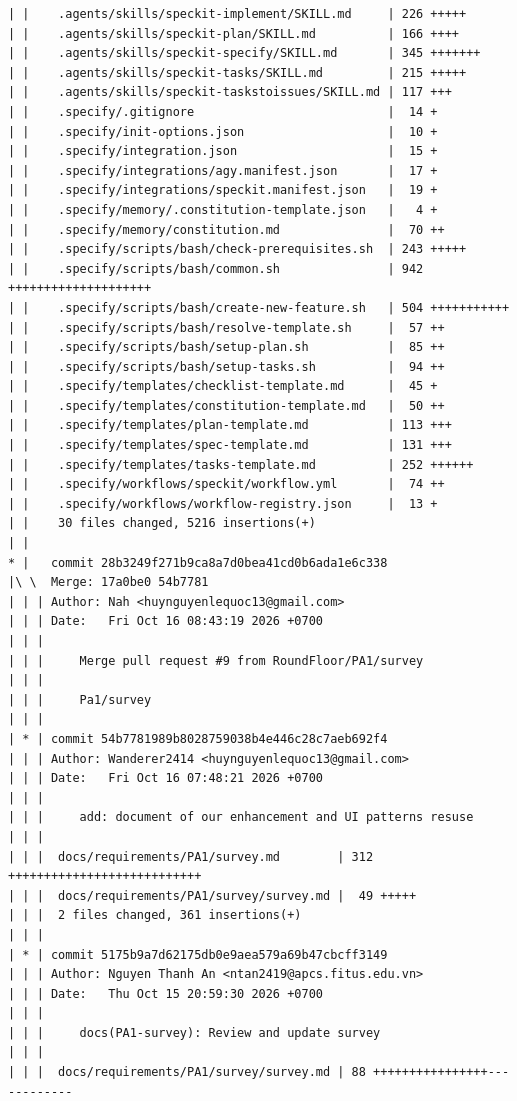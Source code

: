 \documentclass[12pt]{article}
\begin{document}
\begin{lstlisting}[numbers=none,breaklines=true]
| |    .agents/skills/speckit-implement/SKILL.md     | 226 +++++
| |    .agents/skills/speckit-plan/SKILL.md          | 166 ++++
| |    .agents/skills/speckit-specify/SKILL.md       | 345 +++++++
| |    .agents/skills/speckit-tasks/SKILL.md         | 215 +++++
| |    .agents/skills/speckit-taskstoissues/SKILL.md | 117 +++
| |    .specify/.gitignore                           |  14 +
| |    .specify/init-options.json                    |  10 +
| |    .specify/integration.json                     |  15 +
| |    .specify/integrations/agy.manifest.json       |  17 +
| |    .specify/integrations/speckit.manifest.json   |  19 +
| |    .specify/memory/.constitution-template.json   |   4 +
| |    .specify/memory/constitution.md               |  70 ++
| |    .specify/scripts/bash/check-prerequisites.sh  | 243 +++++
| |    .specify/scripts/bash/common.sh               | 942 ++++++++++++++++++++
| |    .specify/scripts/bash/create-new-feature.sh   | 504 +++++++++++
| |    .specify/scripts/bash/resolve-template.sh     |  57 ++
| |    .specify/scripts/bash/setup-plan.sh           |  85 ++
| |    .specify/scripts/bash/setup-tasks.sh          |  94 ++
| |    .specify/templates/checklist-template.md      |  45 +
| |    .specify/templates/constitution-template.md   |  50 ++
| |    .specify/templates/plan-template.md           | 113 +++
| |    .specify/templates/spec-template.md           | 131 +++
| |    .specify/templates/tasks-template.md          | 252 ++++++
| |    .specify/workflows/speckit/workflow.yml       |  74 ++
| |    .specify/workflows/workflow-registry.json     |  13 +
| |    30 files changed, 5216 insertions(+)
| |
* |   commit 28b3249f271b9ca8a7d0bea41cd0b6ada1e6c338
|\ \  Merge: 17a0be0 54b7781
| | | Author: Nah <huynguyenlequoc13@gmail.com>
| | | Date:   Fri Oct 16 08:43:19 2026 +0700
| | |
| | |     Merge pull request #9 from RoundFloor/PA1/survey
| | |
| | |     Pa1/survey
| | |
| * | commit 54b7781989b8028759038b4e446c28c7aeb692f4
| | | Author: Wanderer2414 <huynguyenlequoc13@gmail.com>
| | | Date:   Fri Oct 16 07:48:21 2026 +0700
| | |
| | |     add: document of our enhancement and UI patterns resuse
| | |
| | |  docs/requirements/PA1/survey.md        | 312 +++++++++++++++++++++++++++
| | |  docs/requirements/PA1/survey/survey.md |  49 +++++
| | |  2 files changed, 361 insertions(+)
| | |
| * | commit 5175b9a7d62175db0e9aea579a69b47cbcff3149
| | | Author: Nguyen Thanh An <ntan2419@apcs.fitus.edu.vn>
| | | Date:   Thu Oct 15 20:59:30 2026 +0700
| | |
| | |     docs(PA1-survey): Review and update survey
| | |
| | |  docs/requirements/PA1/survey/survey.md | 88 ++++++++++++++++------------

\end{lstlisting}
\end{document}
